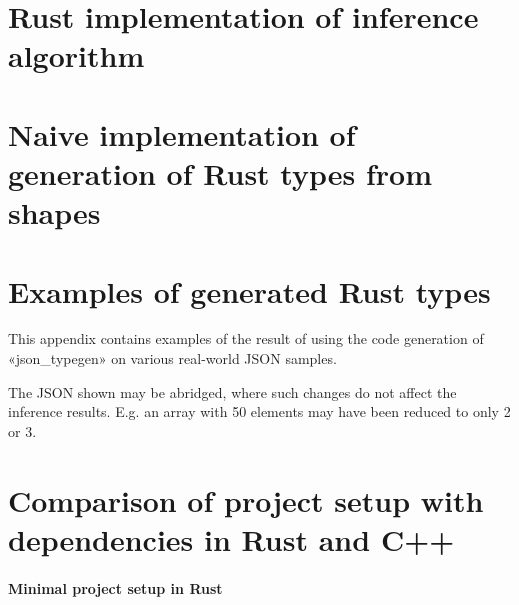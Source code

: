 
\appendix

\chapter{Rust implementation of inference algorithm}
\label{app:inference-code}

\newpage
{}
\newpage
{}

\chapter{Naive implementation of generation of Rust types from shapes}
\label{app:codegen-code}

\newpage
{}

\fancyhfoffset[E,O]{0pt}

\chapter{Examples of generated Rust types}
\label{app:examples-generated-types}

This appendix contains examples of the result of using the code generation of «json_typegen» on various real-world JSON samples.

The JSON shown may be abridged, where such changes do not affect the inference results. E.g. an array with 50 elements may have been reduced to only 2 or 3.


\newpage

\newpage

\newpage


\restoregeometry{}
\fancyhfoffset[E,O]{0pt}

\chapter{Comparison of project setup with dependencies in Rust and C++}
\label{app:cargo-cpp-comparison}

\subsubsection{Minimal project setup in Rust}

